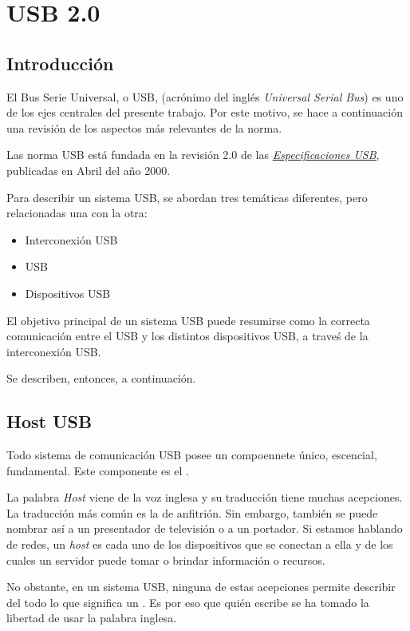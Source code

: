 \chapter{USB 2.0}

  \section{Introducción}
  El Bus Serie Universal, o USB, (acrónimo del inglés {\it Universal Serial Bus})
  es uno de los ejes centrales del presente trabajo. Por este motivo, se hace a
  continuación una revisión de los aspectos más relevantes de la norma.

  Las norma USB está fundada en la revisión 2.0 de las
  \href{www.usb.org}{\it Especificaciones USB}, publicadas en Abril del año 2000.

  Para describir un sistema USB, se abordan tres temáticas diferentes, pero
  relacionadas una con la otra:

  \begin{itemize}
    \item Interconexión USB
    \item \host USB
    \item Dispositivos USB
  \end{itemize}

  El objetivo principal de un sistema USB puede resumirse como la correcta
  comunicación entre el \host USB y los distintos dispositivos USB, a traveś de
  la interconexión USB.

  Se describen, entonces, a continuación.

  \section{Host USB}
  Todo sistema de comunicación USB posee un compoennete único, escencial,
  fundamental. Este componente es el \host.

  La palabra {\it Host} viene de la voz inglesa y su traducción tiene muchas
  acepciones. La traducción más común es la de anfitrión. Sin embargo, también
  se puede nombrar así a un presentador de televisión o a un portador. Si
  estamos hablando de redes, un {\it host} es cada uno de los dispositivos que se
  conectan a ella y de los cuales un servidor puede tomar o brindar información
  o recursos.

  No obstante, en un sistema USB, ninguna de estas acepciones permite describir
  del todo lo que significa un \host. Es por eso que quién escribe se ha tomado
  la libertad de usar la palabra inglesa.

